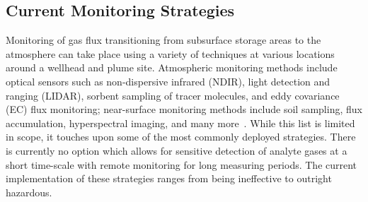 \documentclass[numbook, envcountsect, envcountsame, envcountreset, runningheads, twocolumn]{svjour3}
\begin{document}
		\subsection{Current Monitoring Strategies}
		
			Monitoring of gas flux transitioning from subsurface storage areas to the atmosphere can take place using a variety of techniques at various locations around a wellhead and plume site.  Atmospheric monitoring methods include optical sensors such as non-dispersive infrared (NDIR), light detection and ranging (LIDAR), sorbent sampling of tracer molecules, and eddy covariance (EC) flux monitoring; near-surface monitoring methods include soil sampling, flux accumulation,  hyperspectral imaging, and many more~\cite{netl_best_2012}.  While this list is limited in scope, it touches upon some of the most commonly deployed strategies.  There is currently no option which allows for sensitive detection of analyte gases at a short time-scale with remote monitoring for long measuring periods.  The current implementation of these strategies ranges from being ineffective to outright hazardous.
			
\end{document}
